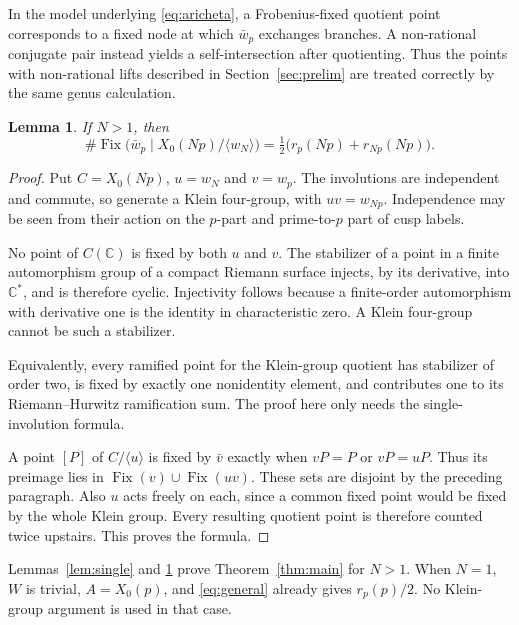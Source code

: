 \documentclass[11pt,a4paper]{article}
\newtheorem{lemma}[theorem]{Lemma}
\theoremstyle{remark}\newtheorem{remark}[theorem]{Remark}
\numberwithin{equation}{section}
\newcommand{\C}{\mathbb C}\newcommand{\Fp}{\mathbb F_p}
\newcommand{\Fix}{\operatorname{Fix}}
\begin{document}
In the model underlying \eqref{eq:aricheta}, a Frobenius-fixed quotient point corresponds to a fixed node at which $\bar w_p$ exchanges branches. A non-rational conjugate pair instead yields a self-intersection after quotienting. Thus the points with non-rational lifts described in Section~\ref{sec:prelim} are treated correctly by the same genus calculation.

\begin{lemma}\label{lem:lift}
If $N>1$, then
\[
\#\Fix\bigl(\bar w_p\mid X_0(Np)/\langle w_N\rangle\bigr)
=\tfrac12\bigl(r_p(Np)+r_{Np}(Np)\bigr).
\]
\end{lemma}
\begin{proof}
Put $C=X_0(Np)$, $u=w_N$ and $v=w_p$. The involutions are independent and commute, so generate a Klein four-group, with $uv=w_{Np}$. Independence may be seen from their action on the $p$-part and prime-to-$p$ part of cusp labels.

No point of $C(\C)$ is fixed by both $u$ and $v$. The stabilizer of a point in a finite automorphism group of a compact Riemann surface injects, by its derivative, into $\C^*$, and is therefore cyclic. Injectivity follows because a finite-order automorphism with derivative one is the identity in characteristic zero. A Klein four-group cannot be such a stabilizer.

Equivalently, every ramified point for the Klein-group quotient has stabilizer of order two, is fixed by exactly one nonidentity element, and contributes one to its Riemann--Hurwitz ramification sum. The proof here only needs the single-involution formula.

A point $[P]$ of $C/\langle u\rangle$ is fixed by $\bar v$ exactly when $vP=P$ or $vP=uP$. Thus its preimage lies in $\Fix(v)\cup\Fix(uv)$. These sets are disjoint by the preceding paragraph. Also $u$ acts freely on each, since a common fixed point would be fixed by the whole Klein group. Every resulting quotient point is therefore counted twice upstairs. This proves the formula.
\end{proof}

Lemmas~\ref{lem:single} and \ref{lem:lift} prove Theorem~\ref{thm:main} for $N>1$. When $N=1$, $W$ is trivial, $A=X_0(p)$, and \eqref{eq:general} already gives $r_p(p)/2$. No Klein-group argument is used in that case.
\end{document}

